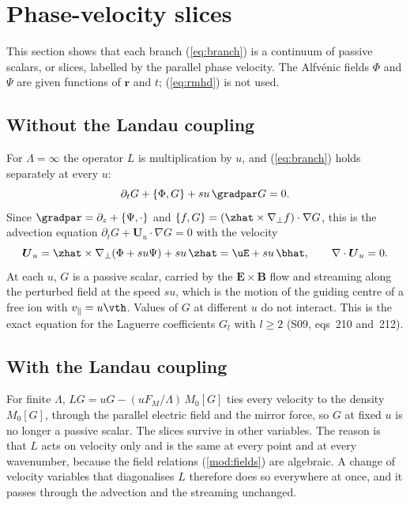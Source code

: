 \section{Phase-velocity slices}\label{sec:slices}

This section shows that each branch (\ref{eq:branch}) is a continuum of passive scalars, or slices, labelled by the parallel phase velocity. The Alfv\'enic fields $\Phi$ and $\Psi$ are given functions of $\boldsymbol r$ and $t$; (\ref{eq:rmhd}) is not used.

\subsection{Without the Landau coupling}\label{sl:nocoupling}

For $\Lambda=\infty$ the operator $L$ is multiplication by $u$, and (\ref{eq:branch}) holds separately at every $u$:
\begin{equation*}
  \partial_tG+\{\Phi,G\}+su\,\gradpar G=0 .
\end{equation*}
Since $\gradpar=\partial_z+\{\Psi,\cdot\}$ and $\{f,G\}=(\zhat\times\nabla_\perp f)\cdot\nabla G$, this is the advection equation $\partial_tG+\boldsymbol U_u\cdot\nabla G=0$ with the velocity
\begin{equation}\label{eq:Uu}
  \boldsymbol U_u=\zhat\times\nabla_\perp(\Phi+su\Psi)+su\,\zhat=\uE+su\,\bhat,\qquad\nabla\cdot\boldsymbol U_u=0 .
\end{equation}
At each $u$, $G$ is a passive scalar, carried by the $\boldsymbol E\times\boldsymbol B$ flow and streaming along the perturbed field at the speed $su$, which is the motion of the guiding centre of a free ion with $v_\parallel=u\vth$. Values of $G$ at different $u$ do not interact. This is the exact equation for the Laguerre coefficients $G_l$ with $l\ge2$ (S09, eqs~210 and~212).

\subsection{With the Landau coupling}\label{sl:transformsec}

For finite $\Lambda$, $LG=uG-(uF_M/\Lambda)\,M_0[G]$ ties every velocity to the density $M_0[G]$, through the parallel electric field and the mirror force, so $G$ at fixed $u$ is no longer a passive scalar. The slices survive in other variables. The reason is that $L$ acts on velocity only and is the same at every point and at every wavenumber, because the field relations (\ref{mod:fields}) are algebraic. A change of velocity variables that diagonalises $L$ therefore does so everywhere at once, and it passes through the advection and the streaming unchanged.

